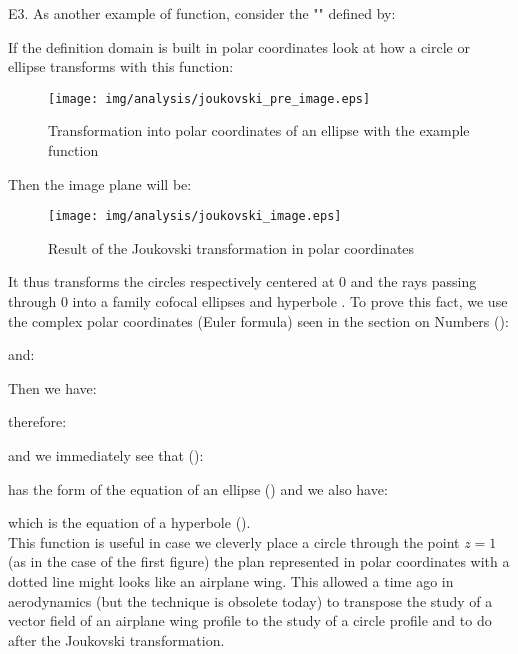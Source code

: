 \pagebreak
	\begin{tcolorbox}[colframe=black,colback=white,sharp corners]
	E3. As another example of function, consider the "" defined by:
	
If the definition domain is built in polar coordinates look at how a circle or ellipse transforms with this function:

	\begin{figure}[H]
		\begin{center}
			\texttt{[image: img/analysis/joukovski\_pre\_image.eps]}
		\end{center}	
		\caption{Transformation into polar coordinates of an ellipse with the example function}
	\end{figure}
Then the image plane will be:
	\begin{figure}[H]
		\begin{center}
			\texttt{[image: img/analysis/joukovski\_image.eps]}
		\end{center}	
		\caption{Result of the Joukovski transformation in polar coordinates}
	\end{figure}
It thus transforms the circles respectively centered at $0$ and the rays passing through $0$ into a family cofocal ellipses and hyperbole . To prove this fact, we use the complex polar coordinates (Euler formula) seen in the section on Numbers ():
	\end{tcolorbox}

	\begin{tcolorbox}[colframe=black,colback=white,sharp corners]
		
	and:
		
Then we have:
		
therefore:
		
and we immediately see that ():
		
has the form of the equation of an ellipse () and we also have:
		
which is the equation of a hyperbole ().\\

This function is useful in case we cleverly place a circle through the point $z=1$ (as in the case of the first figure) the plan represented in polar coordinates with a dotted line might looks like an airplane wing. This allowed a time ago in aerodynamics (but the technique is obsolete today)  to transpose the study of a vector field of an airplane wing profile to the study of a circle profile and to do after the Joukovski transformation.
	\end{tcolorbox}
	
